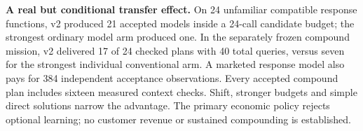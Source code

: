 \textbf{A real but conditional transfer effect.} On 24 unfamiliar compatible response functions, v2 produced 21 accepted models inside a 24-call candidate budget; the strongest ordinary model arm produced one. In the separately frozen compound mission, v2 delivered 17 of 24 checked plans with 40 total queries, versus seven for the strongest individual conventional arm. A marketed response model also pays for 384 independent acceptance observations. Every accepted compound plan includes sixteen measured context checks. Shift, stronger budgets and simple direct solutions narrow the advantage. The primary economic policy rejects optional learning; no customer revenue or sustained compounding is established.
